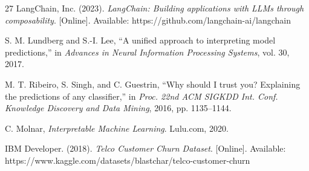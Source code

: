 \documentclass[conference]{IEEEtran}
\begin{document}
\begin{thebibliography}{27}
 LangChain, Inc. (2023). \textit{LangChain: Building applications with LLMs through composability}. [Online]. Available: https://github.com/langchain-ai/langchain

 S. M. Lundberg and S.-I. Lee, ``A unified approach to interpreting model predictions,'' in \textit{Advances in Neural Information Processing Systems}, vol. 30, 2017.

 M. T. Ribeiro, S. Singh, and C. Guestrin, ``Why should I trust you? Explaining the predictions of any classifier,'' in \textit{Proc. 22nd ACM SIGKDD Int. Conf. Knowledge Discovery and Data Mining}, 2016, pp. 1135--1144.

 C. Molnar, \textit{Interpretable Machine Learning}. Lulu.com, 2020.

 IBM Developer. (2018). \textit{Telco Customer Churn Dataset}. [Online]. Available: https://www.kaggle.com/datasets/blastchar/telco-customer-churn
\end{thebibliography}
\end{document}
